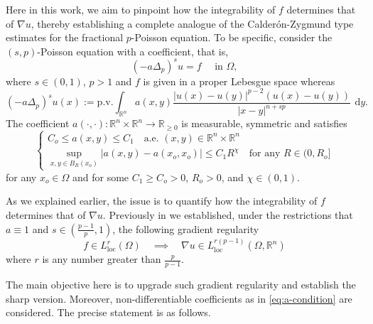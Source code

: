 \documentclass[10pt,letterpaper]{amsart}
\theoremstyle{definition}
\numberwithin{theorem}{section}
\numberwithin{equation}{section}
\newcommand{\R}{\ensuremath{\mathbb{R}}}
\newcommand{\1}{\ensuremath{\mathds{1}}}
\renewcommand{\d}{\:\! \mathrm{d}}
\DeclareMathOperator{\loc}{loc}
\numberwithin{equation}{section}
\begin{document}
Here in this work, we aim to pinpoint how the integrability of $f$ determines that of $\nabla u$, thereby establishing a complete analogue of the Calder\'on-Zygmund type estimates for the fractional $p$-Poisson equation.
To be specific, consider the $(s,p)$-Poisson equation with a coefficient, that is,
\begin{equation} \label{eq:frac-p-lap}
\left( - a \Delta_p\right)^s u = f \quad \text{ in } \Omega,
\end{equation}
 where $s\in(0,1)$, $p>1$ and $f$ is given in a proper Lebesgue space whereas 
$$
(- a\Delta_p )^s u(x) := \mathrm{p.v.} \int_{\R^n} a(x,y)\frac{ |u(x) - u(y)|^{p-2} (u(x) - u(y) )}{|x-y|^{n+sp}}  \, \d y.
$$
The coefficient $a(\cdot,\cdot)\colon\R^n\times\R^n\to \R_{\ge0}$ is measurable, symmetric and satisfies
\begin{equation}\label{eq:a-condition}
\left\{
    \begin{array}{cc}
       C_o\le a(x,y)\le C_1 \quad  \mbox{a.e. $(x,y)\in\R^n\times\R^n$} \\[5pt]
       \displaystyle\sup_{x,y\in B_R(x_o)}|a(x,y)-a(x_o,x_o)|\le C_1 R^{\chi}\quad \mbox{for any $R\in(0,R_o]$}%
    \end{array}
    \right.
\end{equation}
for any $x_o\in \Omega$ and for some $C_1\ge C_o>0$, $R_o>0$,  and $\chi\in(0,1)$. 

As we explained earlier, the issue is to quantify how the integrability of $f$ determines that of $\nabla u$. Previously in \cite{BDLM} we established, under the restrictions that $a\equiv 1$ and $s\in(\frac{p-1}{p},1)$, the following gradient regularity
\[
f\in L^{r}_{\loc}(\Omega)\quad\implies\quad \nabla u\in L^{r(p-1)}_{\loc}(\Omega,\R^n)
\]
where $r$ is any number greater than $\frac{p}{p-1}$.

The main objective here is to upgrade such gradient regularity and establish the sharp version.
Moreover, non-differentiable coefficients as in \eqref{eq:a-condition} are considered. The precise statement is as follows.
\end{document}
